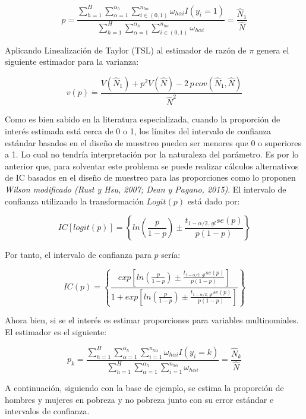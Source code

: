 \documentclass[
  12pt,
]{book}
\begin{document}
\[
p =  \frac{{ \sum_{h=1}^{H}\sum_{\alpha=1}^{\alpha_{h}}\sum_{i\in\left(0,1\right)}^{n_{h\alpha}}}\omega_{h\alpha i}I\left(y_{i}=1\right)}{{ \sum_{h=1}^{H}\sum_{\alpha=1}^{\alpha_{h}}\sum_{i\in\left(0,1\right)}^{n_{h\alpha}}}\omega_{h\alpha i}}
 =  \frac{\hat{N}_{1}}{\hat{N}}
\]

Aplicando Linealización de Taylor (TSL) al estimador de razón de \(\pi\) genera el siguiente estimador para la varianza:

\[
v\left(p\right) \dot{=} \frac{V\left(\hat{N}_{1}\right)+p^{2}V\left(\hat{N}\right)-2\,p\,cov\left(\hat{N}_{1},\hat{N}\right)}{\hat{N}^{2}}
\]

Como es bien sabido en la literatura especializada, cuando la proporción de interés estimada está cerca de 0 o 1, los límites del intervalo de confianza estándar basados en el diseño de muestreo pueden ser menores que 0 o superiores a 1. Lo cual no tendría interpretación por la naturaleza del parámetro. Es por lo anterior que, para solventar este problema se puede realizar cálculos alternativos de IC basados en el diseño de muestreo para las proporciones como lo proponen \emph{Wilson modificado (Rust y Hsu, 2007; Dean y Pagano, 2015)}. El intervalo de confianza utilizando la transformación \(Logit\left(p\right)\)
está dado por:

\[
IC\left[logit\left(p\right)\right]  =  \left\{ ln\left(\frac{p}{1-p}\right)\pm\frac{t_{1-\alpha/2,\,gl}se\left(p\right)}{p\left(1-p\right)}\right\} 
\]

Por tanto, el intervalo de confianza para \(p\) sería:

\[
IC\left(p\right)  =  \left\{ \frac{exp\left[ln\left(\frac{p}{1-p}\right)\pm\frac{t_{1-\alpha/2,\,gl}se\left(p\right)}{p\left(1-p\right)}\right]}{1+exp\left[ln\left(\frac{p}{1-p}\right)\pm\frac{t_{1-\alpha/2,\,gl}se\left(p\right)}{p\left(1-p\right)}\right]}\right\} 
\]

Ahora bien, si se el interés es estimar proporciones para variables multinomiales. El estimador es el siguiente:

\[
p_{k}  =  \frac{{ \sum_{h=1}^{H}\sum_{\alpha=1}^{\alpha_{h}}\sum_{i=1}^{n_{h\alpha}}}\omega_{h\alpha i}I\left(y_{i}=k\right)}{{ \sum_{h=1}^{H}\sum_{\alpha=1}^{\alpha_{h}}\sum_{i=1}^{n_{h\alpha}}}\omega_{h\alpha i}}
 =  \frac{\hat{N}_{k}}{\hat{N}}
\]

A continuación, siguiendo con la base de ejemplo, se estima la proporción de hombres y mujeres en pobreza y no pobreza junto con su error estándar e intervalos de confianza.
\end{document}
